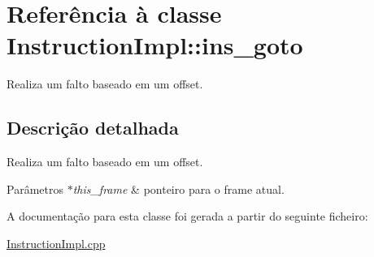 \hypertarget{class_instruction_impl_1_1ins__goto}{}\section{Referência à classe Instruction\+Impl\+:\+:ins\+\_\+goto}
\label{class_instruction_impl_1_1ins__goto}


Realiza um falto baseado em um offset.  




\subsection{Descrição detalhada}
Realiza um falto baseado em um offset. 


\begin{DoxyParams}{Parâmetros}
{\em $\ast$this\+\_\+frame} & ponteiro para o frame atual.  \\
\hline
\end{DoxyParams}


A documentação para esta classe foi gerada a partir do seguinte ficheiro\+:\begin{DoxyCompactItemize}
\item 
\hyperlink{_instruction_impl_8cpp}{Instruction\+Impl.\+cpp}\end{DoxyCompactItemize}
